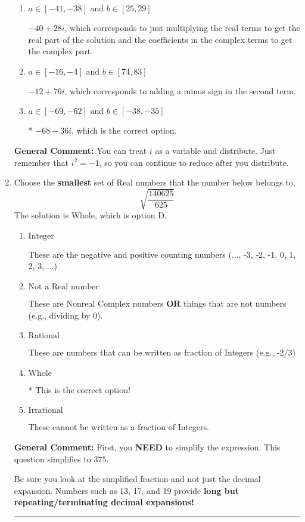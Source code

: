 \documentclass{extbook}[14pt]
\newcommand{\litem}[1]{\item #1

\rule{\textwidth}{0.4pt}}
\begin{document}
\begin{enumerate}
{\begin{enumerate}[label=\Alph*.]
 $-12 - 76 i$, which corresponds to adding a minus sign in the first term.
\item \( a \in [-41, -38] \text{ and } b \in [25, 29] \)

 $-40 + 28 i$, which corresponds to just multiplying the real terms to get the real part of the solution and the coefficients in the complex terms to get the complex part.
\item \( a \in [-16, -4] \text{ and } b \in [74, 83] \)

 $-12 + 76 i$, which corresponds to adding a minus sign in the second term.
\item \( a \in [-69, -62] \text{ and } b \in [-38, -35] \)

* $-68 - 36 i$, which is the correct option.
\end{enumerate}

\textbf{General Comment:} You can treat $i$ as a variable and distribute. Just remember that $i^2=-1$, so you can continue to reduce after you distribute.
}
\litem{
Choose the \textbf{smallest} set of Real numbers that the number below belongs to.
\[ \sqrt{\frac{140625}{625}} \]The solution is \( \text{Whole} \), which is option D.\begin{enumerate}[label=\Alph*.]
\item \( \text{Integer} \)

These are the negative and positive counting numbers (..., -3, -2, -1, 0, 1, 2, 3, ...)
\item \( \text{Not a Real number} \)

These are Nonreal Complex numbers \textbf{OR} things that are not numbers (e.g., dividing by 0).
\item \( \text{Rational} \)

These are numbers that can be written as fraction of Integers (e.g., -2/3)
\item \( \text{Whole} \)

* This is the correct option!
\item \( \text{Irrational} \)

These cannot be written as a fraction of Integers.
\end{enumerate}

\textbf{General Comment:} First, you \textbf{NEED} to simplify the expression. This question simplifies to $375$. 
 
 Be sure you look at the simplified fraction and not just the decimal expansion. Numbers such as 13, 17, and 19 provide \textbf{long but repeating/terminating decimal expansions!} 
 
}
\end{enumerate}
\end{document}
